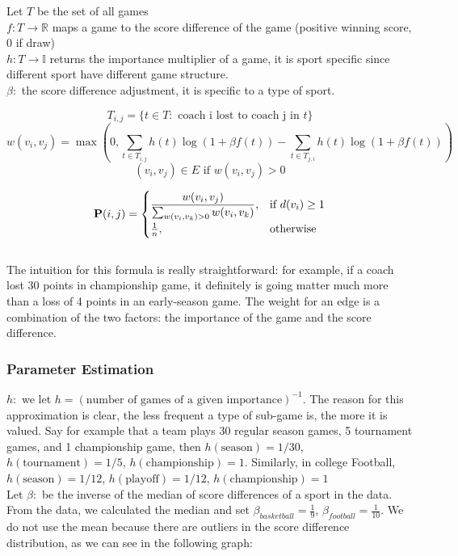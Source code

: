\documentclass[11pt,notitlepage]{article}
\begin{document}
\noindent Let $T$ be the set of all games
\\
$f: T \rightarrow \mathbb{R}$ maps a game to the score difference of the game (positive winning score, 0 if draw)
\\
$h: T \rightarrow \mathbb{I}$ returns the importance multiplier of a game, it is sport specific since different sport have different game structure.
\\
$\beta: $ the score difference adjustment, it is specific to a type of sport.

$$ T_{i,j} = \{t \in T : \mbox{ coach i lost to coach j in } t\} $$
$$w(v_i, v_j) =  \max(0, \sum_{t \in T_{i, j}} h(t) \log(1 + \beta f(t)) - \sum_{t \in T_{j, i}} h(t) \log(1 + \beta f(t))) $$
$$(v_i, v_j) \in E \mbox{ if } w(v_i, v_j) > 0$$

\[
    {\bf P}(i, j)= 
\begin{cases}
    \dfrac{w(v_i, v_j)}{\sum_{w(v_i, v_k) > 0} w(v_i, v_k)},      & \text{if } d(v_i) \geq 1\\
    \frac{1}{n},              & \text{otherwise}
\end{cases}
\]
\\

\noindent The intuition for this formula is really straightforward: for example, if a coach lost 30 points in championship game, it definitely is going matter much more than a loss of 4 points in an early-season game. The weight for an edge is a combination of the two factors: the importance of the game and the score difference.

\subsubsection*{Parameter Estimation}
\noindent $h:$ we let $h = (\text{number of games of a given importance})^{-1}$. The reason for this approximation is clear, the less frequent a type of sub-game is, the more it is valued. Say for example that a team  plays 30 regular season games, 5 tournament games, and 1 championship game, then $h(\mbox{season}) = 1/30$, $h(\mbox{tournament}) = 1/5$, $h(\mbox{championship}) = 1$. Similarly, in college Football, $h(\mbox{season}) = 1/12$, $h(\mbox{playoff}) = 1/12$, $h(\mbox{championship}) = 1$
\\

\noindent Let $\beta:$ be the inverse of the median of score differences of a sport in the data. From the data, we calculated the median and set $\beta_{basketball} = \frac{1}{9}$, $\beta_{football} = \frac{1}{10}$. We do not use the mean because there are outliers in the score difference distribution, as we can see in the following graph:
\\
\end{document}
